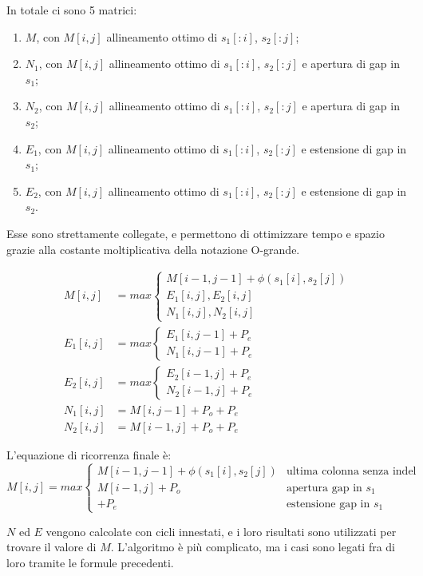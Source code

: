 In totale ci sono 5 matrici:
\begin{enumerate}
	\item $M$, con $M[i, j]$ allineamento ottimo di $s_1[:i]$, $s_2[:j]$;
	\item $N_1$, con $M[i, j]$ allineamento ottimo di $s_1[:i]$, $s_2[:j]$ e apertura di gap in $s_1$;
	\item $N_2$, con $M[i, j]$ allineamento ottimo di $s_1[:i]$, $s_2[:j]$ e apertura di gap in $s_2$;
	\item $E_1$, con $M[i, j]$ allineamento ottimo di $s_1[:i]$, $s_2[:j]$ e estensione di gap in $s_1$;
	\item $E_2$, con $M[i, j]$ allineamento ottimo di $s_1[:i]$, $s_2[:j]$ e estensione di gap in $s_2$.
\end{enumerate}

Esse sono strettamente collegate, e permettono di ottimizzare tempo e spazio grazie alla costante moltiplicativa della notazione O-grande.

\begin{align*}
M[i, j] &= max\begin{cases}
M[i-1, j-1] + \phi(s_1[i], s_2[j]) \\
E_1[i, j], E_2[i, j] \\
N_1[i, j], N_2[i, j]
\end{cases}
\\
E_1[i, j] &= max\begin{cases}
E_1[i, j-1] + P_e \\
N_1[i, j-1] + P_e
\end{cases}
\\
E_2[i, j] &= max\begin{cases}
E_2[i-1, j] + P_e \\
N_2[i-1, j] + P_e
\end{cases}
\\
N_1[i, j] &= M[i, j-1] + P_o + P_e \\
N_2[i, j] &= M[i-1, j] + P_o + P_e
\end{align*}

L'equazione di ricorrenza finale è:
$$M[i, j] = max\begin{cases}
M[i-1, j-1] + \phi(s_1[i], s_2[j]) & \text{ultima colonna senza indel} \\
M[i-1, j] + P_o & \text{apertura gap in } s_1 \\
 + P_e & \text{estensione gap in } s_1
\end{cases}$$

$N$ ed $E$ vengono calcolate con cicli innestati, e i loro risultati sono utilizzati per trovare il valore di $M$. L'algoritmo è più complicato, ma i casi sono legati fra di loro tramite le formule precedenti.

